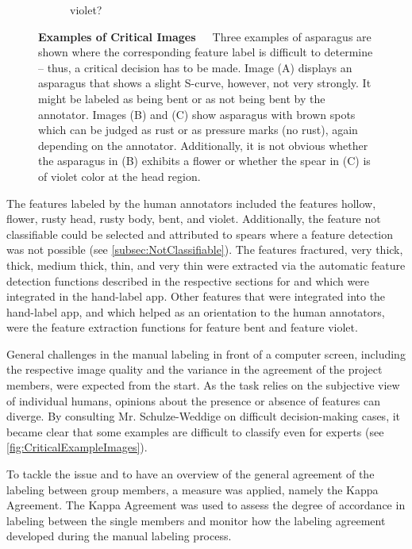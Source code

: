 \begin{figure}[!htb]
\begin{subfigure}{0.3\textwidth}
		\caption{violet?}
	\end{subfigure}
    \caption[Examples of Critical Images]{\textbf{Examples of Critical Images}~~~Three examples of asparagus are shown where the corresponding feature label is difficult to determine -- thus, a critical decision has to be made. Image (A) displays an asparagus that shows a slight S-curve, however, not very strongly. It might be labeled as being bent or as not being bent by the annotator. Images (B) and (C) show asparagus with brown spots which can be judged as rust or as pressure marks (no rust), again depending on the annotator. Additionally, it is not obvious whether the asparagus in (B) exhibits a flower or whether the spear in (C) is of violet color at the head region.}
    \label{fig:CriticalExampleImages}
\end{figure}

The features labeled by the human annotators included the features hollow, flower, rusty head, rusty body, bent, and violet. Additionally, the feature not classifiable could be selected and attributed to spears where a feature detection was not possible (see \autoref{subsec:NotClassifiable}). The features fractured, very thick, thick, medium thick, thin, and very thin were extracted via the automatic feature detection functions described in the respective sections for  and  which were integrated in the hand-label app. Other features that were integrated into the hand-label app, and which helped as an orientation to the human annotators, were the feature extraction functions for feature bent and feature violet. 

General challenges in the manual labeling in front of a computer screen, including the respective image quality and the variance in the agreement of the project members, were expected from the start. As the task relies on the subjective view of individual humans, opinions about the presence or absence of features can diverge. By consulting Mr. Schulze-Weddige on difficult decision-making cases, it became clear that some examples are difficult to classify even for experts (see \autoref{fig:CriticalExampleImages}).

To tackle the issue and to have an overview of the general agreement of the labeling between group members, a measure was applied, namely the Kappa Agreement. The Kappa Agreement was used to assess the degree of accordance in labeling between the single members and monitor how the labeling agreement developed during the manual labeling process. 


